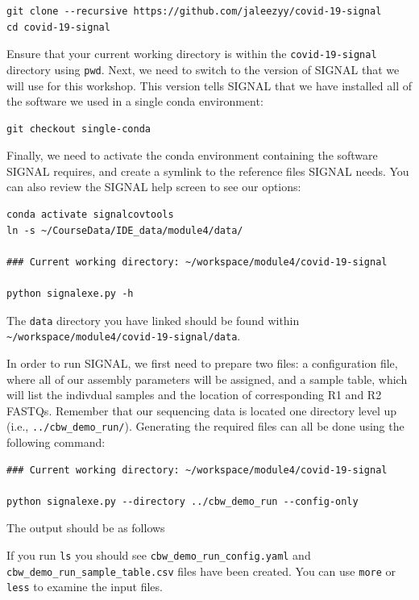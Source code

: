 \documentclass[
]{book}
\begin{document}
\begin{verbatim}
git clone --recursive https://github.com/jaleezyy/covid-19-signal
cd covid-19-signal
\end{verbatim}

Ensure that your current working directory is within the \texttt{covid-19-signal} directory using \texttt{pwd}. Next, we need to switch to the version of SIGNAL that we will use for this workshop. This version tells SIGNAL that we have installed all of the software we used in a single conda environment:

\begin{verbatim}
git checkout single-conda
\end{verbatim}

Finally, we need to activate the conda environment containing the software SIGNAL requires, and create a symlink to the reference files SIGNAL needs. You can also review the SIGNAL help screen to see our options:

\begin{verbatim}
conda activate signalcovtools
ln -s ~/CourseData/IDE_data/module4/data/

### Current working directory: ~/workspace/module4/covid-19-signal

python signalexe.py -h
\end{verbatim}

The \texttt{data} directory you have linked should be found within \texttt{\textasciitilde{}/workspace/module4/covid-19-signal/data}.

In order to run SIGNAL, we first need to prepare two files: a configuration file, where all of our assembly parameters will be assigned, and a sample table, which will list the indivdual samples and the location of corresponding R1 and R2 FASTQs. Remember that our sequencing data is located one directory level up (i.e., \texttt{../cbw\_demo\_run/}). Generating the required files can all be done using the following command:

\begin{verbatim}
### Current working directory: ~/workspace/module4/covid-19-signal

python signalexe.py --directory ../cbw_demo_run --config-only
\end{verbatim}

The output should be as follows

If you run \texttt{ls} you should see \texttt{cbw\_demo\_run\_config.yaml} and \texttt{cbw\_demo\_run\_sample\_table.csv} files have been created. You can use \texttt{more} or \texttt{less} to examine the input files.
\end{document}
